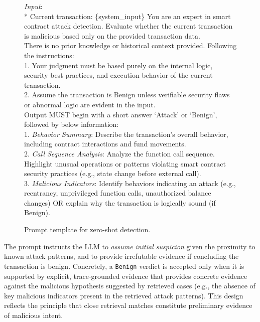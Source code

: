 \begin{figure}[t]
	\begin{tcolorbox}[title=Prompt template for zero-shot detection]
		\emph{Input}:\\
		* Current transaction:  \{system\_input\}
		\tcbline
		You are an expert in smart contract attack detection. Evaluate whether the current transaction is malicious based only on the provided transaction data.\\
		There is no prior knowledge or historical context provided. Following the instructions: \\
		1. Your judgment must be based purely on the internal logic, security best practices, and execution behavior of the current transaction. \\
		2. Assume the transaction is Benign unless verifiable security flaws or abnormal logic are evident in the input.\\
		\tcbline
		Output MUST begin with a short answer `Attack' or `Benign', followed by below information: \\ 
		1. \emph{Behavior Summary}:  Describe the transaction's overall behavior, including contract interactions and fund movements.
		\\
		2. \emph{Call Sequence Analysis}:  Analyze the function call sequence. Highlight unusual operations or patterns violating smart contract security practices (e.g., state change before external call).\\
		3. \emph{Malicious Indicators}: Identify behaviors indicating an attack (e.g., reentrancy, unprivileged function calls, unauthorized balance changes) OR explain why the transaction is logically sound (if Benign).
	\end{tcolorbox}
	
	\caption{Prompt template for zero-shot detection.}
	\label{fig:prompt2}
\end{figure}
The prompt instructs the LLM to \textit{assume initial suspicion} given the proximity to known attack patterns, and to provide irrefutable evidence if concluding the transaction is benign. Concretely, a \texttt{Benign} verdict is accepted only when it is supported by explicit, trace-grounded evidence that provides concrete evidence against the malicious hypothesis suggested by retrieved cases (e.g., the absence of key malicious indicators present in the retrieved attack patterns). This design reflects the principle that close retrieval matches constitute preliminary evidence of malicious intent.

